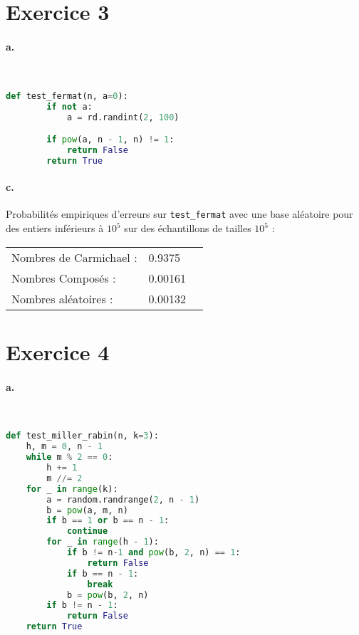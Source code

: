 \documentclass[french]{article}
\begin{document}
\section*{Exercice 3}
\paragraph{a.} \
\begin{lstlisting}[language=Python, belowskip=-1 \baselineskip]
    def test_fermat(n, a=0):
        if not a:
            a = rd.randint(2, 100)

        if pow(a, n - 1, n) != 1:
            return False
        return True
\end{lstlisting}
\paragraph{c.} Probabilités empiriques d'erreurs sur  \verb|test_fermat| avec une base aléatoire pour des entiers inférieurs à $10^5$ sur des échantillons de tailles $10^5$ :\\
\begin{center}

\begin{tabular}{lll}
    Nombres de Carmichael :&0.9375\\
    Nombres Composés : & 0.00161\\
    Nombres aléatoires : &0.00132\\
\end{tabular}

\end{center}
\section*{Exercice 4}
\paragraph{a.} \
\begin{lstlisting}[language=Python, belowskip=-1 \baselineskip]
def test_miller_rabin(n, k=3):
    h, m = 0, n - 1
    while m % 2 == 0:
        h += 1
        m //= 2
    for _ in range(k):
        a = random.randrange(2, n - 1)
        b = pow(a, m, n)
        if b == 1 or b == n - 1:
            continue
        for _ in range(h - 1):
            if b != n-1 and pow(b, 2, n) == 1:
                return False
            if b == n - 1:
                break
            b = pow(b, 2, n)
        if b != n - 1:
            return False
    return True
\end{lstlisting}
\newpage 
\end{document}
